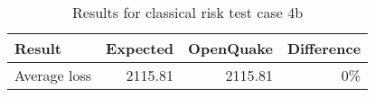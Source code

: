 \begin{table}[htbp]

\centering
\begin{tabular}{ l r r r }

\hline
\rowcolor{anti-flashwhite}
\bf{Result} & \bf{Expected} & \bf{OpenQuake} & \bf{Difference}\\
\hline
Average loss & 2115.81 & 2115.81 & 0\% \\
\hline
\end{tabular}

\caption{Results for classical risk test case 4b}
\label{tab:result-cr-4b}
\end{table}